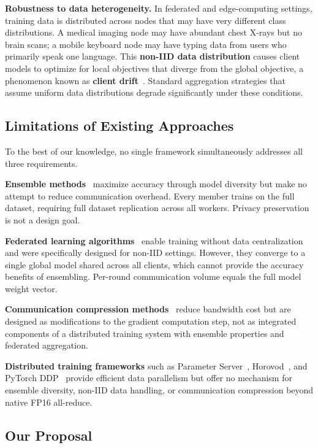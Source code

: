 \documentclass[journal,twoside]{IEEEtran}
\begin{document}
\textbf{Robustness to data heterogeneity.} In federated and
edge-computing settings, training data is distributed across nodes that
may have very different class distributions. A medical imaging node may
have abundant chest X-rays but no brain scans; a mobile keyboard node
may have typing data from users who primarily speak one language. This
\textbf{non-IID data distribution} causes client models to optimize
for local objectives that diverge from the global objective, a
phenomenon known as \textbf{client drift}~\cite{karimireddy2020scaffold}.
Standard aggregation strategies that assume uniform data distributions
degrade significantly under these conditions.

\subsection{Limitations of Existing Approaches}

To the best of our knowledge, no single framework simultaneously addresses all three requirements.

\textbf{Ensemble methods}~\cite{lakshminarayanan2017,huang2017snapshot}
maximize accuracy through model diversity but make no attempt to reduce
communication overhead. Every member trains on the full dataset,
requiring full dataset replication across all workers. Privacy
preservation is not a design goal.

\textbf{Federated learning algorithms}~\cite{mcmahan2017,li2020fedprox,
karimireddy2020scaffold} enable training without data centralization and
were specifically designed for non-IID settings. However, they converge
to a single global model shared across all clients, which cannot provide
the accuracy benefits of ensembling. Per-round communication volume
equals the full model weight vector.

\textbf{Communication compression
methods}~\cite{alistarh2017,bernstein2018,lin2018dgc} reduce bandwidth
cost but are designed as modifications to the gradient computation step,
not as integrated components of a distributed training system with
ensemble properties and federated aggregation.

\textbf{Distributed training frameworks} such as Parameter
Server~\cite{li2014ps}, Horovod~\cite{sergeev2018}, and PyTorch
DDP~\cite{li2020ddp} provide efficient data parallelism but offer no
mechanism for ensemble diversity, non-IID data handling, or
communication compression beyond native FP16 all-reduce.

\subsection{Our Proposal}
\end{document}
